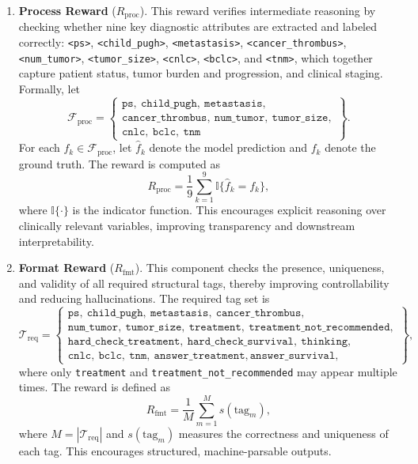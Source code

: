\documentclass{article}
\begin{document}
\begin{enumerate}
\renewcommand{\labelenumi}{(\arabic{enumi})}
    \item \textbf{Process Reward} ($R_{\text{proc}}$).  
    This reward verifies intermediate reasoning by checking whether nine key diagnostic attributes are extracted and labeled correctly: \texttt{<ps>}, \texttt{<child\_pugh>}, \texttt{<metastasis>}, \texttt{<cancer\_thrombus>}, \texttt{<num\_tumor>}, \texttt{<tumor\_size>}, \texttt{<cnlc>}, \texttt{<bclc>}, and \texttt{<tnm>}, which together capture patient status, tumor burden and progression, and clinical staging. 
    Formally, let
     \[
\mathcal{F}_{\mathrm{proc}} =
\left\{
\begin{array}{l}
\texttt{ps},\ \texttt{child\_pugh},\ \texttt{metastasis},\\
\texttt{cancer\_thrombus},\ \texttt{num\_tumor},\ \texttt{tumor\_size},\\
\texttt{cnlc},\ \texttt{bclc},\ \texttt{tnm}
\end{array}
\right\}.
\]
    For each $f_k \in \mathcal{F}_{\mathrm{proc}}$, let $\hat f_k$ denote the model prediction and $f_k$ denote the ground truth. 
    The reward is computed as
    \begin{equation}
        R_{\text{proc}} = \frac{1}{9} \sum_{k=1}^{9} \mathbb{I}\{\hat f_k = f_k\},
    \end{equation}
    where $\mathbb{I}\{\cdot\}$ is the indicator function. 
    This encourages explicit reasoning over clinically relevant variables, improving transparency and downstream interpretability.

    \item \textbf{Format Reward} ($R_{\text{fmt}}$).  
    This component checks the presence, uniqueness, and validity of all required structural tags, thereby improving controllability and reducing hallucinations. 
    The required tag set is
    \[
\mathcal{T}_{\mathrm{req}} =
\left\{
\begin{array}{l}
\texttt{ps},\ \texttt{child\_pugh},\ \texttt{metastasis},\ \texttt{cancer\_thrombus},\\
\texttt{num\_tumor},\ \texttt{tumor\_size},\ \texttt{treatment},\ \texttt{treatment\_not\_recommended},\\
\texttt{hard\_check\_treatment},\ \texttt{hard\_check\_survival},\ \texttt{thinking}, \\
\texttt{cnlc},\ \texttt{bclc},\ \texttt{tnm},\ \texttt{answer\_treatment}, \texttt{answer\_survival}, 
\end{array}
\right\},
\] 
    where only \texttt{treatment} and \texttt{treatment\_not\_recommended} may appear multiple times. 
    The reward is defined as
    \begin{equation}
        R_{\text{fmt}} = \frac{1}{M} \sum_{m=1}^{M} s(\text{tag}_m),
    \end{equation}
    where $M = |\mathcal{T}_{\mathrm{req}}|$ and $s(\text{tag}_m)$ measures the correctness and uniqueness of each tag. 
    This encourages structured, machine-parsable outputs.


\end{enumerate}
\end{document}

